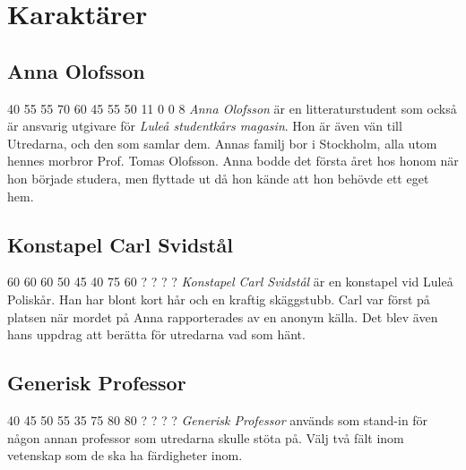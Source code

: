 \section{Karaktärer}
\subsection{Anna Olofsson}
\label{kar:AnnaOlofsson}
\character
{40}	%
{55}	%
{55}	%
{70}	%
{60}	%
{45}	%
{55}	%
{50}	%
{11}	%
{0}		%
{0}		%
{8}		%
%
{
}
%
{
\textit{Anna Olofsson} är en litteraturstudent som också är ansvarig utgivare för \textit{Luleå studentkårs magasin}. Hon är även vän till Utredarna, och den som samlar dem. Annas familj bor i Stockholm, alla utom hennes morbror Prof. Tomas Olofsson. Anna bodde det första året hos honom när hon började studera, men flyttade ut då hon kände att hon behövde ett eget hem.
}

\subsection{Konstapel Carl Svidstål}
\label{kar:KonstapelCarlSvidstal}
\character
{60}	%
{60}	%
{60}	%
{50}	%
{45}	%
{40}	%
{75}	%
{60}	%
{?}		%
{?}		%
{?}		%
{?}		%
%
{
}
%
{
\textit{Konstapel Carl Svidstål} är en konstapel vid Luleå Poliskår. Han har blont kort hår och en kraftig skäggstubb. Carl  var först på platsen när mordet på Anna rapporterades av en anonym källa. Det blev även hans uppdrag att berätta för utredarna vad som hänt.
}
%
\subsection{Generisk Professor}
\label{kar:GeneriskProfessor}
\character
{40}	%
{45}	%
{50}	%
{55}	%
{35}	%
{75}	%
{80}	%
{80}	%
{?}	%
{?}		%
{?}		%
{?}		%
%
{
}
%
{
\textit{Generisk Professor} används som stand-in för någon annan professor som utredarna skulle stöta på. Välj två fält inom vetenskap som de ska ha färdigheter inom.
}
%
